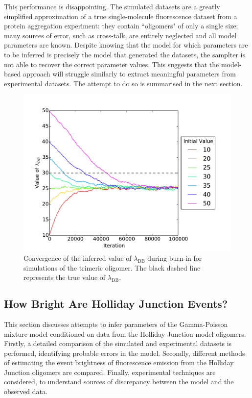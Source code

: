 This performance is disappointing. The simulated datasets are a greatly simplified approximation of a true single-molecule fluorescence dataset from a protein aggregation experiment: they contain ``oligomers" of only a single size; many sources of error, such as cross-talk, are entirely neglected and all model parameters are known. Despite knowing that the model for which parameters are to be inferred is precisely the model that generated the datasets, the samplter is not able to recover the correct parameter values. This suggests that the model-based approach will struggle similarly to extract meaningful parameters from experimental datasets. The attempt to do so is summarised in the next section.

\begin{figure}
   \begin{center}
      \includegraphics*[clip=true, width=6in]{sizing/Convergence.pdf}
      \caption{Convergence of the inferred value of $\lambda_{\text{DB}}$ during burn-in for simulations of the trimeric oligomer. The black dashed line represents the true value of $\lambda_{\text{DB}}$.}
      \label{fig:convergence}
   \end{center}
\end{figure}

\subsection{How Bright Are Holliday Junction Events?}
This section discusses attempts to infer parameters of the Gamma-Poisson mixture model conditioned on data from the Holliday Junction model oligomers. Firstly, a detailed comparison of the simulated and experimental datasets is performed, identifying probable errors in the model. Secondly, different methods of estimating the event brightness of fluorescence emission from the Holliday Junction oligomers are compared. Finally, experimental techniques are considered, to understand sources of discrepancy between the model and the observed data.

